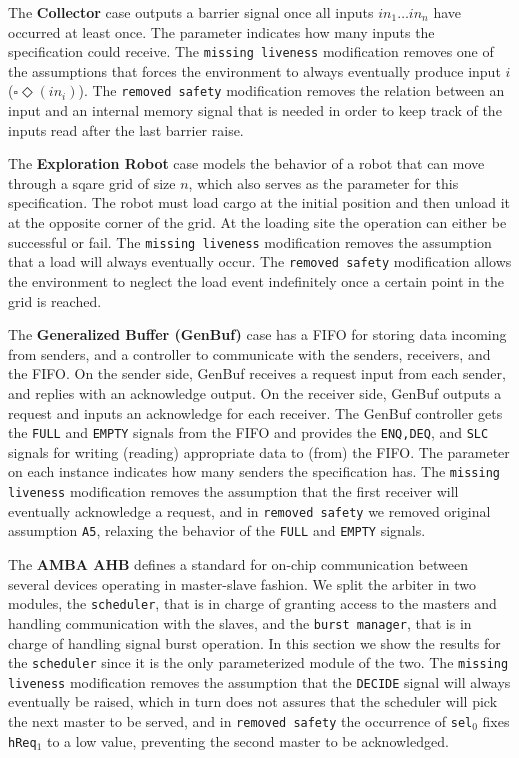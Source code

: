 The \textbf{Collector} case outputs a barrier signal once all inputs $in_1\ldots in_n$ have occurred at least once. The parameter indicates how many inputs the specification could receive. The \texttt{missing liveness} modification removes one of the assumptions that forces the environment to always eventually produce input $i$ ($\square\Diamond(in_i)$). The \texttt{removed safety} modification removes the relation between an input and an internal memory signal that is needed in order to keep track of the inputs read after the last barrier raise.

The \textbf{Exploration Robot} case models the behavior of a robot that can move through a sqare grid of size $n$, which also serves as the parameter for this specification. The robot must load cargo at the initial position and then unload it at the opposite corner of the grid. At the loading site the operation can either be successful or fail. The \texttt{missing liveness} modification removes the assumption that a load will always eventually occur. The \texttt{removed safety} modification allows the environment to neglect the load event indefinitely once a certain point in the grid is reached.

The \textbf{Generalized Buffer (GenBuf)} case has a FIFO for storing data incoming from senders, and a
controller to communicate with the senders, receivers, and the
FIFO. On the sender side, GenBuf receives a request input from each sender, and replies
with an acknowledge output. On the receiver side, GenBuf outputs a request and inputs an
acknowledge for each receiver. The GenBuf controller gets the \texttt{FULL} and \texttt{EMPTY} signals from the FIFO and
provides the \texttt{ENQ,DEQ}, and \texttt{SLC} signals for writing (reading) appropriate data to (from) the FIFO.
The parameter on each instance indicates how many senders the specification has. The \texttt{missing liveness} modification removes the assumption that the first receiver will eventually acknowledge a request, and in \texttt{removed safety} we removed original assumption \texttt{A5}, relaxing the behavior of the \texttt{FULL} and \texttt{EMPTY} signals.

The \textbf{AMBA AHB} defines a standard for on-chip communication between several devices operating in master-slave fashion. We split the arbiter in two modules, the \texttt{scheduler}, that is in charge of granting access to the masters and handling communication with the slaves, and the \texttt{burst manager}, that is in charge of handling signal burst operation. In this section we show the results for the \texttt{scheduler} since it is the only parameterized module of the two. 
The \texttt{missing liveness} modification removes the assumption that the \texttt{DECIDE} signal will always eventually be raised, which in turn does not assures that the scheduler will pick the next master to be served, and in \texttt{removed safety} the occurrence of \texttt{sel$_0$} fixes \texttt{hReq$_1$} to a low value, preventing the second master to be acknowledged. 

